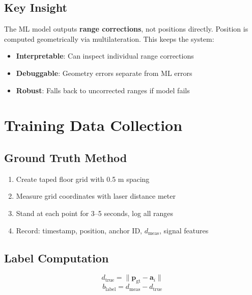 \documentclass[11pt,a4paper]{article}
\begin{document}
\subsection{Key Insight}

The ML model outputs \textbf{range corrections}, not positions directly. Position is computed geometrically via multilateration. This keeps the system:
\begin{itemize}
    \item \textbf{Interpretable}: Can inspect individual range corrections
    \item \textbf{Debuggable}: Geometry errors separate from ML errors
    \item \textbf{Robust}: Falls back to uncorrected ranges if model fails
\end{itemize}

\section{Training Data Collection}

\subsection{Ground Truth Method}

\begin{enumerate}
    \item Create taped floor grid with 0.5 m spacing
    \item Measure grid coordinates with laser distance meter
    \item Stand at each point for 3--5 seconds, log all ranges
    \item Record: timestamp, position, anchor ID, $d_{\text{meas}}$, signal features
\end{enumerate}

\subsection{Label Computation}

\begin{equation}
    d_{\text{true}} = \|\mathbf{p}_{\text{gt}} - \mathbf{a}_i\|
\end{equation}
\begin{equation}
    b_{\text{label}} = d_{\text{meas}} - d_{\text{true}}
\end{equation}
\end{document}

